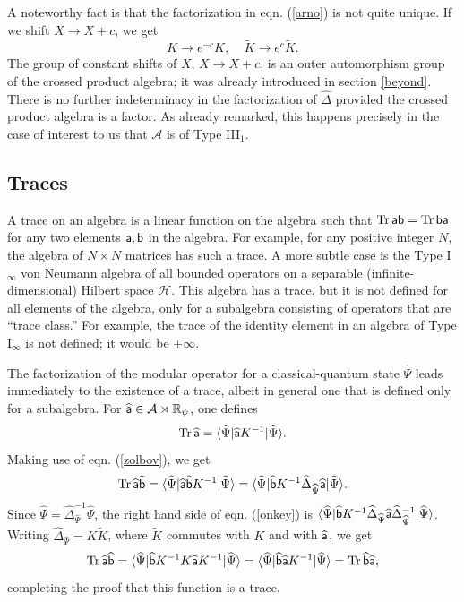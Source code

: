 \documentclass[11pt,a4paper]{article}
\def\t{{ \sf t}}
\def\a{{\sf a}}
\def\b{{\sf b}}
\def\be{\begin{equation}}
\def\ee{\end{equation}}
\def\h{\widehat}
\def\A{{\mathcal A}}
\def\R{{\mathbb R}}
\def\t{\widetilde }
\def\h{\widehat}
\def\la{\langle}
\def\ra{\rangle}
\def\H{{\mathcal H}}
\def\Tr{\mathrm{Tr}}
\begin{document}
A noteworthy fact is that the factorization in eqn. (\ref{arno}) is not quite unique.   If we shift $X\to X+c$, we get
\be\label{bildo} K\to e^{-c }K,~~~~~\t K\to e^c\t K. \ee         The group of constant shifts of $X$, $X\to X+c$, is an outer automorphism
group of the crossed product algebra; it was already introduced in 
 section \ref{beyond}.     
  There is no further indeterminacy in the factorization of $\h\Delta$ 
provided the crossed product algebra is a factor.       As already remarked, this happens precisely in the case of interest to us that $\A$ is of Type III$_1$. 

\subsection{Traces} \label{traces}

A trace on an algebra  is a linear function on the algebra such that $\Tr\,\a\b=\Tr\,\b\a$ for any two elements $\a,\b$ in the algebra. 
For example, for any positive integer  $N$, the algebra of $N\times N$ matrices  has such a trace.
A more subtle case is the Type I$_\infty$  von Neumann algebra  of all bounded operators on a separable (infinite-dimensional)
Hilbert space $\H$.  This algebra has a trace, but it is not
defined for all elements of the algebra, only for a subalgebra consisting of operators
 that are ``trace class.'' For example, the trace of the identity element in an algebra of Type I$_\infty$ is not defined; it would be $+\infty$.

The factorization  of the modular operator for a classical-quantum state $\h\Psi$ 
leads immediately to the existence of a trace, albeit in general one that is defined only for a subalgebra.
For $\h\a\in \A\rtimes \R_\psi$, one defines 
\be\label{donkeyd}\Tr\,\h\a=\la\h\Psi|\h\a K^{-1}|\h\Psi\ra. \ee
Making use of eqn. (\ref{zolbov}), we get
\be\label{onkey} \Tr\,\h\a\h\b =\la\h\Psi|\h\a\h\b K^{-1}|\h\Psi\ra=\la \h\Psi|\h\b K^{-1} \h\Delta_{\h\Psi} \h\a|\h\Psi\ra.\ee
Since $\h\Psi=\h\Delta_{\h\Psi}^{-1}\h\Psi$, the right hand side of eqn. (\ref{onkey}) is $\la\h\Psi|\h\b K^{-1} \h\Delta_{\h\Psi} \h\a\h\Delta_{\h\Psi}^{-1}|\h\Psi\ra$.
Writing $\h\Delta_{ \h \Psi}=K\t K$, where $\t K$ commutes with $K$ and with $\h\a$, we get
\be\label{nkey}\Tr\,\h\a\h\b=\la\h\Psi|\h\b K^{-1}K \h\a K^{-1}|\h\Psi\ra=\la\h\Psi|\h\b\h\a K^{-1}|\h\Psi\ra = \Tr\,\h\b\h\a, \ee
completing the proof that this function is a trace.  
\end{document}
